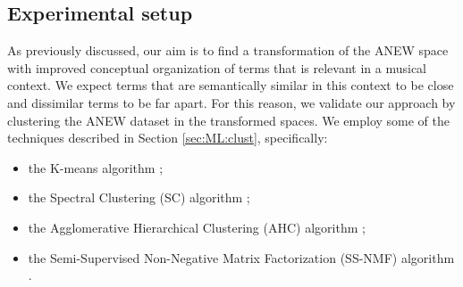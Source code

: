 \subsection{Experimental setup}
\label{sec:ANEW:results}
As previously discussed, our aim is to find a transformation of the ANEW space with improved conceptual organization of terms that is relevant in a musical context. We expect terms that are semantically similar in this context to be close and dissimilar terms to be far apart. For this reason, we validate our approach by clustering the ANEW dataset in the transformed spaces. We employ some of the techniques described in Section \ref{sec:ML:clust}, specifically:
\begin{itemize}
\item the K-means algorithm  \cite{macqueen1967some};
\item the Spectral Clustering (SC) algorithm \cite{shi2000normalized};
\item the Agglomerative Hierarchical Clustering (AHC) algorithm \cite{sibson1973slink};
\item the Semi-Supervised Non-Negative Matrix Factorization (SS-NMF) algorithm \cite{chen2008} .
\end{itemize}




